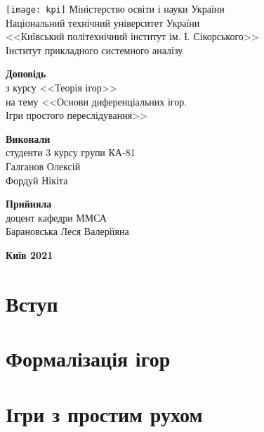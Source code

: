 \documentclass{extreport}
\begin{document}
\begin{titlepage}
    \thispagestyle{empty}
    \begin{center}
        \texttt{[image: kpi]}
        Міністерство освіти і науки України\\
        Національний технічний університет України\\
        <<Київський політехнічний інститут ім. І. Сікорського>>\\
        Інститут прикладного системного аналізу
    \end{center}
    \vspace{30mm}
    \begin{center}
        \fontsize{22}{26}\selectfont\textbf{Доповідь} \\
        з курсу <<Теорія ігор>> \\
        на тему <<Основи диференціальних ігор. \\ Ігри простого переслідування>>
    \end{center}
    \vspace{30mm}
    \begin{flushleft}
        \textbf{Виконали} \\ 
        студенти 3 курсу групи КА-81 \\
        Галганов Олексій \\
        Фордуй Нікіта
    \end{flushleft}
    \begin{flushright}
        \textbf{Прийняла} \\
        доцент кафедри ММСА \\
        Барановська Леся Валеріївна
    \end{flushright}
    \vspace{30mm}
    \begin{center}
        \textbf{Київ 2021}
    \end{center}
\end{titlepage}
\tableofcontents
    \chapter{Вступ}
        
    \chapter{Формалізація ігор}
        
    \chapter{Ігри з простим рухом}
        
\end{document}
